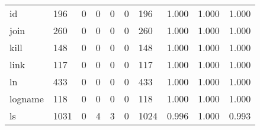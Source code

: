 \begin{longtable}{lp{2.0cm}p{2.0cm}p{2.0cm}p{2.0cm}p{2.0cm}p{2.0cm}p{2.0cm}p{2.0cm}p{2.0cm}}
id        &                    196 &                                  0 &                                 0 &                                0 &                                 0 &                             196 &                                   1.000 &                                  1.000 &                                1.000 \\
join      &                    260 &                                  0 &                                 0 &                                0 &                                 0 &                             260 &                                   1.000 &                                  1.000 &                                1.000 \\
kill      &                    148 &                                  0 &                                 0 &                                0 &                                 0 &                             148 &                                   1.000 &                                  1.000 &                                1.000 \\
link      &                    117 &                                  0 &                                 0 &                                0 &                                 0 &                             117 &                                   1.000 &                                  1.000 &                                1.000 \\
ln        &                    433 &                                  0 &                                 0 &                                0 &                                 0 &                             433 &                                   1.000 &                                  1.000 &                                1.000 \\
logname   &                    118 &                                  0 &                                 0 &                                0 &                                 0 &                             118 &                                   1.000 &                                  1.000 &                                1.000 \\
ls        &                   1031 &                                  0 &                                 4 &                                3 &                                 0 &                            1024 &                                   0.996 &                                  1.000 &                                0.993 \\

\end{longtable}
